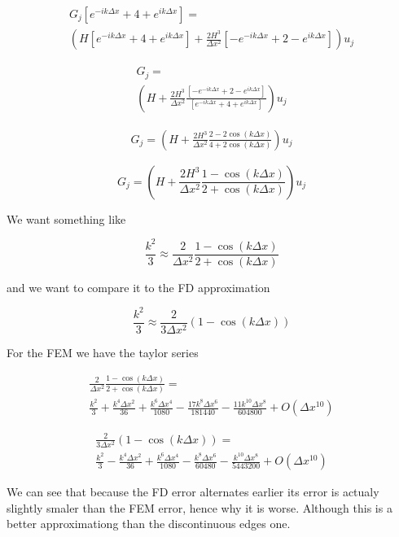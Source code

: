 \documentclass[12pt]{article}
\begin{document}
\begin{multline}
G_j\left[e^{- ik\Delta x} + 4  +  e^{ik\Delta x}  \right] = \\ \left( H \left[e^{- ik \Delta x} + 4   +  e^{ik \Delta x}  \right] +  \frac{2H^3}{\Delta x^2}\left[- e^{- ik \Delta x}  + 2 -  e^{ik \Delta x} \right] \right)u_j
\end{multline}

\begin{multline}
G_j= \\ \left( H  +  \frac{2H^3}{\Delta x^2}\frac{\left[- e^{- ik\Delta x}  + 2  -  e^{ik \Delta x} \right]}{\left[e^{- ik\Delta x} + 4  +  e^{ik\Delta x}  \right]} \right)u_j
\end{multline}

\begin{multline}
G_j=  \left( H  +  \frac{2H^3}{\Delta x^2}\frac{ 2  -2\cos\left(k \Delta x\right) }{4   +2\cos\left(k \Delta x\right) } \right)u_j
\end{multline}

\[
G_j=  \left( H  +  \frac{2H^3}{\Delta x^2}\frac{1  -\cos\left(k \Delta x\right) }{2   +\cos\left(k \Delta x\right) } \right)u_j\]

We want something like

\[\frac{k^2}{3} \approx  \frac{2}{\Delta x^2}\frac{1  -\cos\left(k \Delta x\right) }{2   +\cos\left(k \Delta x\right) }\]

and we want to compare it to the FD approximation

\[\frac{k^2}{3} \approx  \frac{2}{3\Delta x^2}\left(1  -\cos\left(k \Delta x\right)\right)\]

For the FEM we have the taylor series

\begin{multline}
 \frac{2}{\Delta x^2}\frac{1  -\cos\left(k \Delta x\right) }{2   +\cos\left(k \Delta x\right) } = \\ \frac{k^2}{3} + \frac{k^4 \Delta x^2}{36} + \frac{k^6  \Delta x^4}{1080} - \frac{17k^8 \Delta x^6}{181440} - \frac{11k^{10} \Delta x^{8}}{604800} + O(\Delta x^{10})
\end{multline}

\begin{multline}
\frac{2}{3\Delta x^2}\left(1  -\cos\left(k \Delta x\right)\right) = \\ \frac{k^2}{3} - \frac{k^4 \Delta x^2}{36} + \frac{k^6 \Delta x^4}{1080} - \frac{k^8 \Delta x^6}{60480} - \frac{k^{10} \Delta x^{8}}{5443200} + O(\Delta x^{10})
\end{multline}

We can see that because the FD error alternates earlier its error is actualy slightly smaler than the FEM error, hence why it is worse. Although this is a better approximationg than the discontinuous edges one. 
\end{document}
